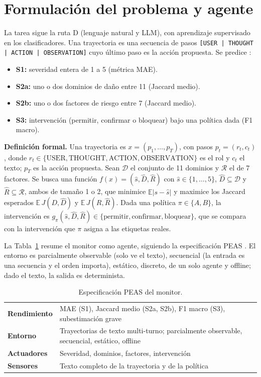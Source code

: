 \documentclass[conference]{IEEEtran}
\begin{document}
\section{Formulación del problema y agente}
La tarea sigue la ruta D (lenguaje natural y LLM), con aprendizaje supervisado en los clasificadores. Una trayectoria es una secuencia de pasos \texttt{[USER | THOUGHT | ACTION | OBSERVATION]} cuyo último paso es la acción propuesta. Se predice \cite{task2026}:
\begin{itemize}
\item \textbf{S1:} severidad entera de 1 a 5 (métrica MAE).
\item \textbf{S2a:} uno o dos dominios de daño entre 11 (Jaccard medio).
\item \textbf{S2b:} uno o dos factores de riesgo entre 7 (Jaccard medio).
\item \textbf{S3:} intervención (permitir, confirmar o bloquear) bajo una política dada (F1 macro).
\end{itemize}

\textbf{Definición formal.} Una trayectoria es $x=(p_1,\dots,p_T)$, con pasos $p_t=(r_t,c_t)$, donde $r_t\in\{\mathrm{USER},\mathrm{THOUGHT},\mathrm{ACTION},\mathrm{OBSERVATION}\}$ es el rol y $c_t$ el texto; $p_T$ es la acción propuesta. Sean $\mathcal D$ el conjunto de 11 dominios y $\mathcal R$ el de 7 factores. Se busca una función $f(x)=(\hat s,\hat D,\hat R)$ con $\hat s\in\{1,\dots,5\}$, $\hat D\subseteq\mathcal D$ y $\hat R\subseteq\mathcal R$, ambos de tamaño 1 o 2, que minimice $\mathbb E|s-\hat s|$ y maximice los Jaccard esperados $\mathbb E\,J(D,\hat D)$ y $\mathbb E\,J(R,\hat R)$. Dada una política $\pi\in\{A,B\}$, la intervención es $g_\pi(\hat s,\hat D,\hat R)\in\{\text{permitir},\text{confirmar},\text{bloquear}\}$, que se compara con la intervención que $\pi$ asigna a las etiquetas reales.

La Tabla~\ref{tab:peas} resume el monitor como agente, siguiendo la especificación PEAS \cite{rn2021}. El entorno es parcialmente observable (solo ve el texto), secuencial (la entrada es una secuencia y el orden importa), estático, discreto, de un solo agente y offline; dado el texto, la salida es determinista.

\begin{table}[t]
\centering
\caption{Especificación PEAS del monitor.}
\label{tab:peas}
\footnotesize
\begin{tabular}{@{}lp{6.1cm}@{}}
\toprule
\textbf{Rendimiento} & MAE (S1), Jaccard medio (S2a, S2b), F1 macro (S3), subestimación grave \\
\textbf{Entorno} & Trayectorias de texto multi-turno; parcialmente observable, secuencial, estático, offline \\
\textbf{Actuadores} & Severidad, dominios, factores, intervención \\
\textbf{Sensores} & Texto completo de la trayectoria y de la política \\
\bottomrule
\end{tabular}
\end{table}
\end{document}
